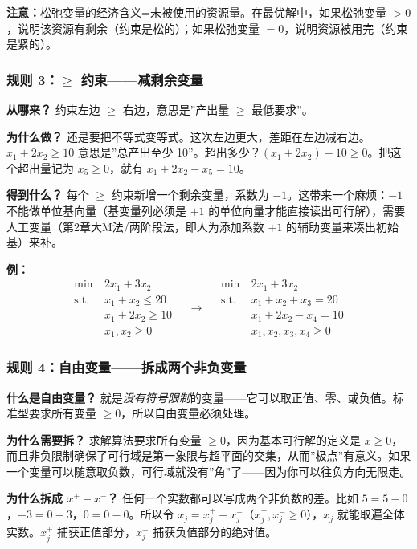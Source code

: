 {\textbf{注意：}松弛变量的经济含义=未被使用的资源量。在最优解中，如果松弛变量 $>0$，说明该资源有剩余（约束是松的）；如果松弛变量 $=0$，说明资源被用完（约束是紧的）。

\subsubsection{规则 3：$\ge$ 约束——减剩余变量}

\textbf{从哪来？} 约束左边 $\ge$ 右边，意思是”产出量 $\ge$ 最低要求”。

\textbf{为什么做？} 还是要把不等式变等式。这次左边更大，差距在左边减右边。$x_1+2x_2\ge 10$ 意思是”总产出至少 10”。超出多少？$(x_1+2x_2)-10 \ge 0$。把这个超出量记为 $x_5\ge 0$，就有 $x_1+2x_2-x_5=10$。

\textbf{得到什么？} 每个 $\ge$ 约束新增一个剩余变量，系数为 $-1$。这带来一个麻烦：$-1$ 不能做单位基向量（基变量列必须是 $+1$ 的单位向量才能直接读出可行解），需要人工变量（第2章大M法/两阶段法，即人为添加系数 $+1$ 的辅助变量来凑出初始基）来补。

\textbf{例：}
\[
\begin{aligned}
\min\ & 2x_1 + 3x_2 \\
\text{s.t.}\ & x_1 + x_2 \le 20 \\
& x_1 + 2x_2 \ge 10 \\
& x_1, x_2 \ge 0
\end{aligned}
\quad\longrightarrow\quad
\begin{aligned}
\min\ & 2x_1 + 3x_2 \\
\text{s.t.}\ & x_1 + x_2 + x_3 = 20 \\
& x_1 + 2x_2 - x_4 = 10 \\
& x_1,x_2,x_3,x_4 \ge 0
\end{aligned}
\]

\subsubsection{规则 4：自由变量——拆成两个非负变量}

\textbf{什么是自由变量？} 就是\emph{没有符号限制}的变量——它可以取正值、零、或负值。标准型要求所有变量 $\ge 0$，所以自由变量必须处理。

\textbf{为什么需要拆？} 求解算法要求所有变量 $\ge 0$，因为基本可行解的定义是 $x\ge 0$，而且非负限制确保了可行域是第一象限与超平面的交集，从而”极点”有意义。如果一个变量可以随意取负数，可行域就没有”角”了——因为你可以往负方向无限走。

\textbf{为什么拆成 $x^+ - x^-$？} 任何一个实数都可以写成两个非负数的差。比如 $5 = 5-0$，$-3 = 0-3$，$0=0-0$。所以令 $x_j = x_j^+ - x_j^-$（$x_j^+,x_j^-\ge 0$），$x_j$ 就能取遍全体实数。$x_j^+$ 捕获正值部分，$x_j^-$ 捕获负值部分的绝对值。

}
